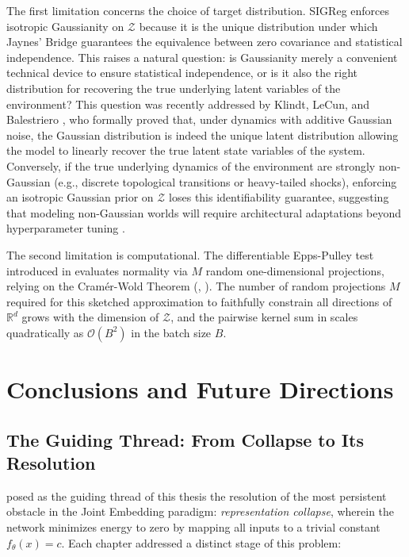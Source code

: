 \documentclass[11pt, oneside, openany]{book}
\begin{document}
The first limitation concerns the choice of target distribution. SIGReg enforces isotropic Gaussianity on $\mathcal{Z}$ because it is the unique distribution under which Jaynes' Bridge guarantees the equivalence between zero covariance and statistical independence. This raises a natural question: is Gaussianity merely a convenient technical device to ensure statistical independence, or is it also the right distribution for recovering the true underlying latent variables of the environment? This question was recently addressed by Klindt, LeCun, and Balestriero \cite{klindt2026when}, who formally proved that, under dynamics with additive Gaussian noise, the Gaussian distribution is indeed the unique latent distribution allowing the model to linearly recover the true latent state variables of the system. Conversely, if the true underlying dynamics of the environment are strongly non-Gaussian (e.g., discrete topological transitions or heavy-tailed shocks), enforcing an isotropic Gaussian prior on $\mathcal{Z}$ loses this identifiability guarantee, suggesting that modeling non-Gaussian worlds will require architectural adaptations beyond hyperparameter tuning \cite{klindt2026when}.

The second limitation is computational. The differentiable Epps-Pulley test introduced in  evaluates normality via $M$ random one-dimensional projections, relying on the Cram\'er-Wold Theorem (, ). The number of random projections $M$ required for this sketched approximation to faithfully constrain all directions of $\mathbb{R}^{d}$ grows with the dimension of $\mathcal{Z}$, and the pairwise kernel sum in  scales quadratically as $\mathcal{O}(B^{2})$ in the batch size $B$.

\chapter{Conclusions and Future Directions}
\label{chap:8}

\section{The Guiding Thread: From Collapse to Its Resolution}
\label{sec:8.1}

 posed as the guiding thread of this thesis the resolution of the most persistent obstacle in the Joint Embedding paradigm: \textit{representation collapse}, wherein the network minimizes energy to zero by mapping all inputs to a trivial constant $f_{\theta}(x) = c$. Each chapter addressed a distinct stage of this problem:
\end{document}
